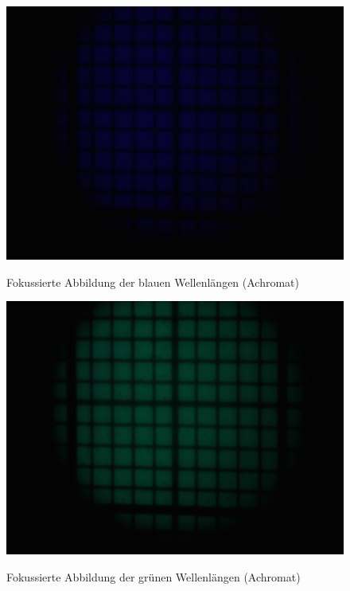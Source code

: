 \begin{figure}[htb]
	\begin{minipage}[t]{0.32\textwidth}
		\includegraphics[clip=true, trim=700px 950px 900px 250px, width=\linewidth]{img/ChromAbb/Prakt_Linsenfehler_2015_06_04_071}
		\label{fig:cm_blau_achromat}
		\caption{Fokussierte Abbildung der blauen Wellenlängen (Achromat)}
	\end{minipage}
	\hfill
	\begin{minipage}[t]{0.32\textwidth}
		\includegraphics[clip=true, trim=700px 950px 900px 250px, width=\linewidth]{img/ChromAbb/Prakt_Linsenfehler_2015_06_04_072}
		\label{fig:cm_gruen_achromat}
		\caption{Fokussierte Abbildung der grünen Wellenlängen (Achromat)}
	\end{minipage}
	\hfill
	\begin{minipage}[t]{0.32\textwidth}

\end{minipage}
\end{figure}
